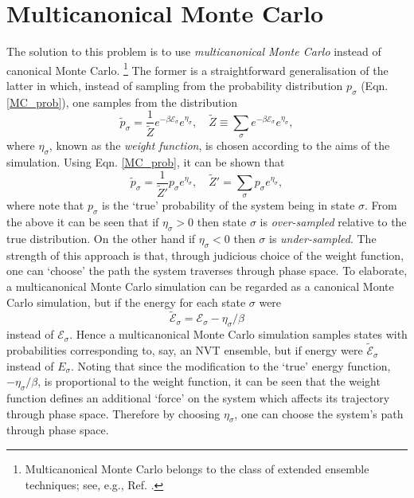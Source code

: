 \documentclass{report}
\begin{document}
\section{Multicanonical Monte Carlo}
The solution to this problem is to use \emph{multicanonical Monte Carlo}\cite{Berg_1991,Berg_1992,Smith_1995} instead of canonical Monte Carlo.
\footnote{Multicanonical Monte Carlo belongs to the class of extended ensemble techniques; see, e.g., Ref. \cite{Iba_2001}.}
The former is a straightforward generalisation of the latter in which, instead of sampling from the probability distribution $p_{\sigma}$ 
(Eqn. \eqref{MC_prob}), one samples from the distribution
\begin{equation}\label{MCMC_prob}
\tilde{p}_{\sigma}=\frac{1}{\tilde{Z}}e^{-\beta \mathcal{E}_{\sigma}}e^{\eta_{\sigma}}, \quad \tilde{Z}\equiv\sum_{\sigma}e^{-\beta \mathcal{E}_{\sigma}}e^{\eta_{\sigma}},
\end{equation}
where $\eta_{\sigma}$, known as the \emph{weight function}, is chosen according to the aims of the simulation. 
Using Eqn. \eqref{MC_prob}, it can be shown that
\begin{equation}\label{MCMC_prob_2}
\tilde{p}_{\sigma}=\frac{1}{\tilde{Z}'}p_{\sigma}e^{\eta_{\sigma}}, \quad \tilde{Z}'=\sum_{\sigma}p_{\sigma}e^{\eta_{\sigma}},
\end{equation}
where note that $p_{\sigma}$ is the `true' probability of the system being in state $\sigma$. From the above it can be seen that if 
$\eta_{\sigma}>0$ then state $\sigma$ is \emph{over-sampled} relative to the true distribution. On the other hand if $\eta_{\sigma}<0$ then 
$\sigma$ is \emph{under-sampled}. 
The strength of this approach is that, through judicious choice of the weight function, one can `choose' the path the system traverses 
through phase space. To elaborate, a multicanonical Monte Carlo simulation can be regarded as a canonical Monte Carlo 
simulation, but if the energy for each state $\sigma$ were 
\begin{equation}
\tilde{\mathcal{E}}_{\sigma}=\mathcal{E}_{\sigma}-\eta_{\sigma}/\beta
\end{equation}
instead of $\mathcal{E}_{\sigma}$. Hence a multicanonical Monte Carlo simulation samples states with probabilities corresponding to, say, an NVT ensemble,
but if energy were $\tilde{\mathcal{E}}_{\sigma}$ instead of $E_{\sigma}$. Noting that since the modification to the `true' energy function, 
$-\eta_{\sigma}/\beta$, is proportional to the weight function, it can be seen that the weight function defines an additional `force' on the system 
which affects its trajectory through phase space. Therefore by choosing $\eta_{\sigma}$, one can choose the system's path through phase space. 
\end{document}

